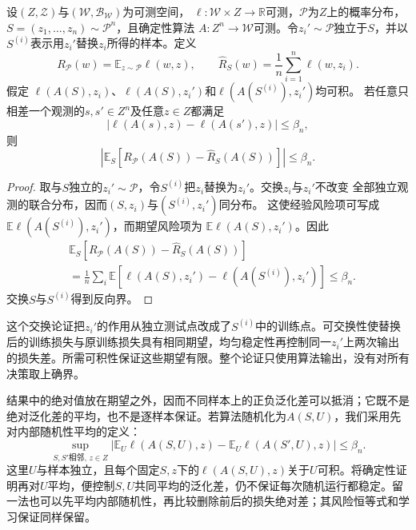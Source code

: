 \begin{theorem}[均匀稳定性与期望风险]
\label{thm:stability-expected-generalization}
设$(Z,\mathcal Z)$与$(\mathcal W,\mathcal B_{\mathcal W})$为可测空间，
$\ell:\mathcal W\times Z\to\mathbb R$可测，$\mathcal P$为$Z$上的概率分布，
$S=(z_1,\ldots,z_n)\sim\mathcal P^n$，且确定性算法
$A:Z^n\to\mathcal W$可测。令$z_i'\sim\mathcal P$独立于$S$，并以
$S^{(i)}$表示用$z_i'$替换$z_i$所得的样本。定义
\[
 R_{\mathcal P}(w)=\mathbb E_{z\sim\mathcal P}\ell(w,z),
 \qquad
 \hat R_S(w)=\frac1n\sum_{i=1}^n\ell(w,z_i).
\]
假定
$\ell(A(S),z_i)$、$\ell(A(S),z_i')$和$\ell(A(S^{(i)}),z_i')$均可积。
若任意只相差一个观测的$s,s'\in Z^n$及任意$z\in Z$都满足
\[
 |\ell(A(s),z)-\ell(A(s'),z)|\leq\beta_n,
\]
则
\begin{equation}
 \left|\mathbb E_S\left[R_{\mathcal P}(A(S))-\hat R_S(A(S))\right]\right|
 \leq\beta_n.
 \label{eq:stability-expectation-bound}
\end{equation}
\end{theorem}

\begin{proof}
取与$S$独立的$z_i'\sim\mathcal P$，令$S^{(i)}$把$z_i$替换为$z_i'$。交换$z_i$与$z_i'$不改变
全部独立观测的联合分布，因而$(S,z_i)$与$(S^{(i)},z_i')$同分布。
这使经验风险项可写成$\mathbb E\ell(A(S^{(i)}),z_i')$，而期望风险项为
$\mathbb E\ell(A(S),z_i')$。因此
\begin{align*}
 &\mathbb E_S[R_{\mathcal P}(A(S))-\hat R_S(A(S))]\\
 &=\frac1n\sum_i\mathbb E
   [\ell(A(S),z_i')-\ell(A(S^{(i)}),z_i')]
 \leq\beta_n.
\end{align*}
交换$S$与$S^{(i)}$得到反向界。

\end{proof}

这个交换论证把$z_i'$的作用从独立测试点改成了$S^{(i)}$中的训练点。可交换性使替换后的训练损失与原训练损失具有相同期望，均匀稳定性再控制同一$z_i'$上两次输出的损失差。所需可积性保证这些期望有限。整个论证只使用算法输出，没有对所有决策取上确界。

结果中的绝对值放在期望之外，因而不同样本上的正负泛化差可以抵消；它既不是绝对泛化差的平均，也不是逐样本保证。若算法随机化为$A(S,U)$，我们采用先对内部随机性平均的定义：
\[
 \sup_{S,S'\text{相邻},\,z\in Z}
 \left|\mathbb E_U\ell(A(S,U),z)-\mathbb E_U\ell(A(S',U),z)\right|\leq\beta_n.
\]
这里$U$与样本独立，且每个固定$S,z$下的$\ell(A(S,U),z)$关于$U$可积。将确定性证明再对$U$平均，便控制$S,U$共同平均的泛化差，仍不保证每次随机运行都稳定。留一法也可以先平均内部随机性，再比较删除前后的损失绝对差；其风险恒等式和学习保证同样保留。

